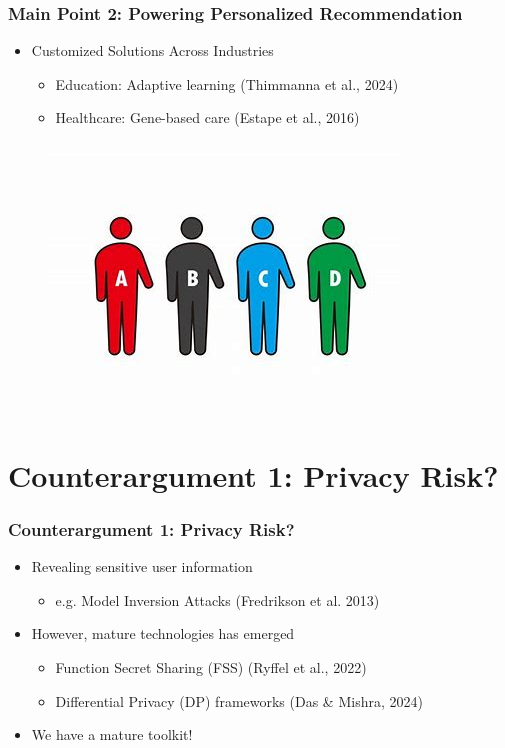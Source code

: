 \documentclass{beamer}
\begin{document}
\begin{frame}
 \frametitle{Main Point 2: Powering Personalized Recommendation}
\begin{minipage}{\textwidth}
{\linespread{1.3}
\begin{itemize}
    \item {\Large Customized Solutions Across Industries}
    \begin{itemize}
        \item <1-> {\large Education: Adaptive learning} (Thimmanna et al., 2024)
        \item <2-> {\large Healthcare: Gene-based care} (Estape et al., 2016)
    \end{itemize}
\end{itemize}
}
\begin{figure}
    \centering
    \includegraphics[width=0.45\linewidth]{figure 5.png}
    \label{fig:enter-label}
\end{figure}
\end{minipage}
\end{frame}



\section{Counterargument 1: Privacy Risk?}
\begin{frame}
 \frametitle{Counterargument 1: Privacy Risk?}
\begin{minipage}{\textwidth}
{\linespread{1.8}
\begin{itemize}
    \item <1-> {\Large Revealing sensitive user information}\\
    \begin{itemize}
        \item {\large e.g. Model Inversion Attacks} (Fredrikson et al. 2013)
    \end{itemize}
    \item <2-> {\Large However, mature technologies has emerged}
    \begin{itemize}
        \item {\large Function Secret Sharing (FSS)} (Ryffel et al., 2022)
        \item {\large Differential Privacy (DP) frameworks} (Das \& Mishra, 2024)
    \end{itemize}
    \item <3-> {\Large We have a mature toolkit!}
\end{itemize}
}

\end{minipage}
\end{frame}
\end{document}
